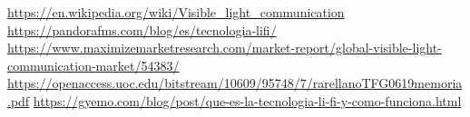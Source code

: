 
 \url{https://en.wikipedia.org/wiki/Visible_light_communication}
 \url{https://pandorafms.com/blog/es/tecnologia-lifi/}
 \url{https://www.maximizemarketresearch.com/market-report/global-visible-light-communication-market/54383/}
 \url{https://openaccess.uoc.edu/bitstream/10609/95748/7/rarellanoTFG0619memoria.pdf}
\url{https://gyemo.com/blog/post/que-es-la-tecnologia-li-fi-y-como-funciona.html}